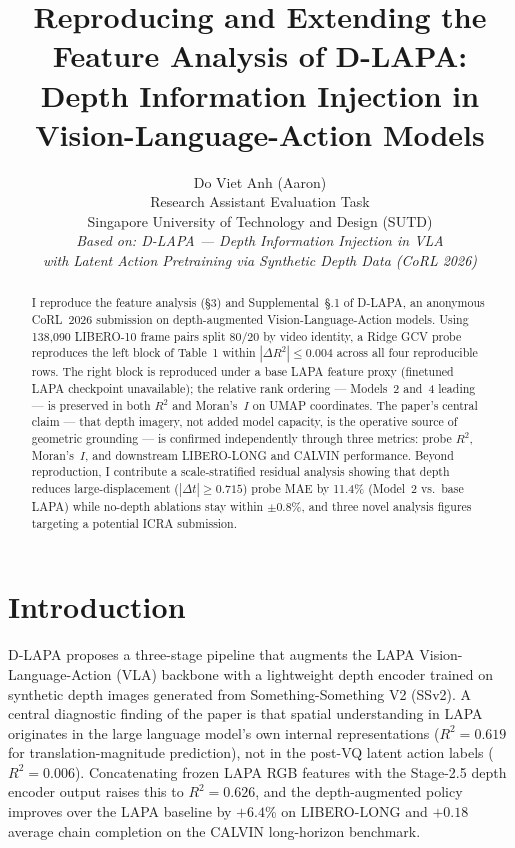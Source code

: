 \documentclass[11pt]{article}
\title{Reproducing and Extending the Feature Analysis of D-LAPA:\\
Depth Information Injection in Vision-Language-Action Models}
\author{
  Do Viet Anh (Aaron)\\
  Research Assistant Evaluation Task\\
  Singapore University of Technology and Design (SUTD)\\[4pt]
  \textit{Based on: D-LAPA --- Depth Information Injection in VLA} \\
  \textit{with Latent Action Pretraining via Synthetic Depth Data (CoRL 2026)}
}
\date{}
\begin{document}
\maketitle

\begin{abstract}
I reproduce the feature analysis (\S3) and Supplemental~\S.1 of D-LAPA, an
anonymous CoRL~2026 submission on depth-augmented Vision-Language-Action
models. Using 138,090 LIBERO-10 frame pairs split 80/20 by video identity, a Ridge GCV
probe reproduces the left block of Table~1 within $|\Delta R^2| \le 0.004$
across all four reproducible rows.
The right block is reproduced under a base LAPA feature proxy (finetuned LAPA
checkpoint unavailable); the relative rank ordering --- Models~2 and~4 leading
--- is preserved in both $R^2$ and Moran's~$I$ on UMAP coordinates.
The paper's central claim --- that depth imagery, not added model capacity, is
the operative source of geometric grounding --- is confirmed independently
through three metrics: probe $R^2$, Moran's~$I$, and downstream LIBERO-LONG
and CALVIN performance. Beyond reproduction, I contribute a scale-stratified residual analysis showing
that depth reduces large-displacement ($|\Delta t| \ge 0.715$) probe MAE by
11.4\% (Model~2 vs.\ base LAPA) while no-depth ablations stay within
$\pm 0.8\%$, and three novel analysis figures targeting a potential ICRA
submission.
\end{abstract}

\section{Introduction}

D-LAPA proposes a three-stage pipeline that augments the LAPA
Vision-Language-Action (VLA) backbone with a lightweight depth encoder trained
on synthetic depth images generated from Something-Something V2 (SSv2).
A central diagnostic finding of the paper is that spatial understanding in LAPA
originates in the large language model's own internal representations
($R^2{=}0.619$ for translation-magnitude prediction), not in the post-VQ
latent action labels ($R^2{=}0.006$).
Concatenating frozen LAPA RGB features with the Stage-2.5 depth encoder output
raises this to $R^2{=}0.626$, and the depth-augmented policy improves over the
LAPA baseline by $+6.4$\% on LIBERO-LONG and $+0.18$ average chain completion
on the CALVIN long-horizon benchmark.
\end{document}
